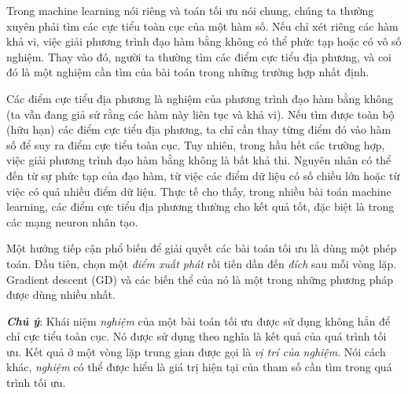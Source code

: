 Trong machine learning nói riêng và toán tối ưu nói chung, chúng ta thường xuyên
phải tìm các cực tiểu toàn cục của một hàm số. Nếu chỉ xét riêng các hàm khả vi,
việc giải phương trình đạo hàm bằng không có thể phức tạp hoặc có vô số nghiệm.
Thay vào đó, người ta thường tìm các điểm cực tiểu địa phương, và coi đó là một
nghiệm cần tìm của bài toán trong những trường hợp nhất định.

Các điểm cực tiểu địa phương là nghiệm của phương trình đạo hàm bằng không (ta
vẫn đang giả sử rằng các hàm này liên tục và khả vi). Nếu tìm được toàn bộ (hữu
hạn) các điểm cực tiểu địa phương, ta chỉ cần thay từng điểm đó vào hàm số để
suy ra điểm cực tiểu toàn cục. Tuy nhiên, trong hầu hết các trường hợp, việc
giải phương trình đạo hàm bằng không là bất khả thi. Nguyên nhân có thể đến từ
sự phức tạp của đạo hàm, từ việc các điểm dữ liệu có số chiều lớn hoặc từ việc
có quá nhiều điểm dữ liệu. Thực tế cho thấy, trong nhiều bài toán machine
learning, các điểm cực tiểu địa phương thường cho kết quả tốt, đặc biệt là
trong các mạng neuron nhân tạo.

Một hướng tiếp cận phổ biến để giải quyết các bài toán tối ưu là dùng một phép
toán. Đầu tiên, chọn một \textit{điểm xuất phát} rồi tiến dần đến \textit{đích}
sau mỗi vòng lặp. Gradient descent (GD) và các biến thể của nó là một trong
những phương pháp được dùng nhiều nhất.

\textit{\textbf{Chú ý}}: Khái niệm \textit{nghiệm} của một bài toán tối ưu được sử dụng không hẳn để chỉ cực tiểu toàn cục. Nó được sử dụng theo nghĩa là kết quả của quá trình tối ưu. Kết quả ở một vòng lặp trung gian được gọi là \textit{vị trí của nghiệm}. Nói cách khác, \textit{nghiệm} có thể được hiểu là giá trị hiện tại của tham số cần tìm trong quá trình tối ưu.



